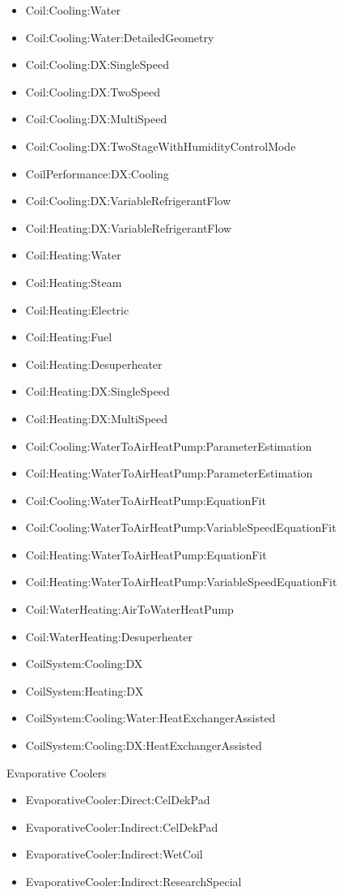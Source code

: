 \begin{itemize}
\tightlist
\item
  Coil:Cooling:Water
\item
  Coil:Cooling:Water:DetailedGeometry
\item
  Coil:Cooling:DX:SingleSpeed
\item
  Coil:Cooling:DX:TwoSpeed
\item
  Coil:Cooling:DX:MultiSpeed
\item
  Coil:Cooling:DX:TwoStageWithHumidityControlMode
\item
  CoilPerformance:DX:Cooling
\item
  Coil:Cooling:DX:VariableRefrigerantFlow
\item
  Coil:Heating:DX:VariableRefrigerantFlow
\item
  Coil:Heating:Water
\item
  Coil:Heating:Steam
\item
  Coil:Heating:Electric
\item
  Coil:Heating:Fuel
\item
  Coil:Heating:Desuperheater
\item
  Coil:Heating:DX:SingleSpeed
\item
  Coil:Heating:DX:MultiSpeed
\item
  Coil:Cooling:WaterToAirHeatPump:ParameterEstimation
\item
  Coil:Heating:WaterToAirHeatPump:ParameterEstimation
\item
  Coil:Cooling:WaterToAirHeatPump:EquationFit
\item
  Coil:Cooling:WaterToAirHeatPump:VariableSpeedEquationFit
\item
  Coil:Heating:WaterToAirHeatPump:EquationFit
\item
  Coil:Heating:WaterToAirHeatPump:VariableSpeedEquationFit
\item
  Coil:WaterHeating:AirToWaterHeatPump
\item
  Coil:WaterHeating:Desuperheater
\item
  CoilSystem:Cooling:DX
\item
  CoilSystem:Heating:DX
\item
  CoilSystem:Cooling:Water:HeatExchangerAssisted
\item
  CoilSystem:Cooling:DX:HeatExchangerAssisted
\end{itemize}

Evaporative Coolers

\begin{itemize}
\tightlist
\item
  EvaporativeCooler:Direct:CelDekPad
\item
  EvaporativeCooler:Indirect:CelDekPad
\item
  EvaporativeCooler:Indirect:WetCoil
\item
  EvaporativeCooler:Indirect:ResearchSpecial
\end{itemize}

